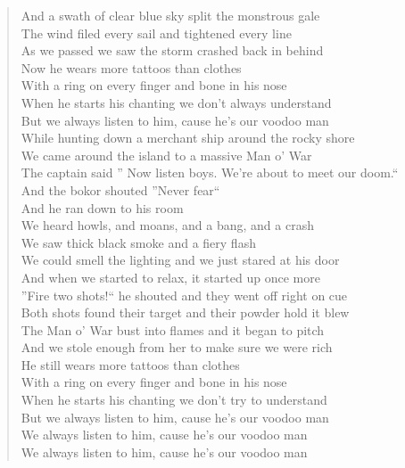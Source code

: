 \documentclass[11pt]{article}
\begin{document}
\begin{verse}
And a swath of clear blue sky split the monstrous gale\\
The wind filed every sail and tightened every line\\
As we passed we saw the storm crashed back in behind\\
\vspace*{1em}
Now he wears more tattoos than clothes\\
With a ring on every finger and bone in his nose\\
When he starts his chanting we don't always understand\\
But we always listen to him, cause he's our voodoo man\\
\vspace*{1em}
While hunting down a merchant ship around the rocky shore\\
We came around the island to a massive Man o' War\\
The captain said '' Now listen boys. We're about to meet our doom.``\\
And the bokor shouted ''Never fear``\\
And he ran down to his room\\
We heard howls, and moans, and a bang, and a crash\\
We saw thick black smoke and a fiery flash\\
We could smell the lighting and we just stared at his door\\
And when we started to relax, it started up once more\\
\vspace*{1em}
''Fire two shots!`` he shouted and they went off right on cue\\
Both shots found their target and their powder hold it blew\\
The Man o' War bust into flames and it began to pitch\\
And we stole enough from her to make sure we were rich\\
\vspace*{1em}
He still wears more tattoos than clothes\\
With a ring on every finger and bone in his nose\\
When he starts his chanting we don't try to understand\\
But we always listen to him, cause he's our voodoo man\\
We always listen to him, cause he's our voodoo man\\
We always listen to him, cause he's our voodoo man\\
\end{verse}
\clearpage
\end{document}
